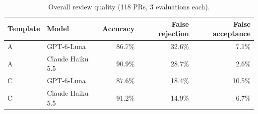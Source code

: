 \begin{table}[t]
\centering\small
\begin{tabular}{llrrr}
\toprule
Template & Model & Accuracy & False rejection & False acceptance \\
\midrule
A & GPT-6-Luna & 86.7\% & 32.6\% & 7.1\% \\
A & Claude Haiku 5.5 & 90.9\% & 28.7\% & 2.6\% \\
C & GPT-6-Luna & 87.6\% & 18.4\% & 10.5\% \\
C & Claude Haiku 5.5 & 91.2\% & 14.9\% & 6.7\% \\
\bottomrule
\end{tabular}
\caption{Overall review quality (118 PRs, 3 evaluations each).}
\label{tab:template-summary}
\end{table}
